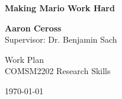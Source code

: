 \documentclass[a4paper]{article}
\begin{document}



\begin{titlepage}
    \begin{center}
        \vspace*{4cm}
        
        \Huge\textbf{Making Mario Work Hard}
        
        
        \vspace{2.5cm}
        
       \Large\textbf{Aaron Ceross}
       \\Supervisor: Dr. Benjamin Sach
        
        \vspace{0.8cm}
        
        Work Plan\\
        COMSM2202 Research Skills
        
        \vspace{0.8cm}
        \vspace{0.8cm}
        
        
        \today
        
    \end{center}
\end{titlepage}



\tableofcontents

\pagebreak

\end{document}
